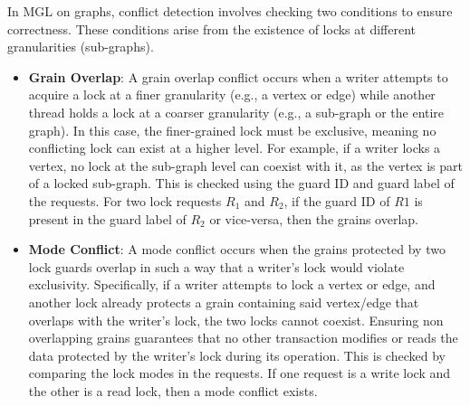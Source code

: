 In MGL on graphs, conflict detection involves checking two conditions to ensure correctness. These conditions arise from the existence of locks at different granularities (sub-graphs).
\begin{itemize}
	\item \textbf{Grain Overlap}: A grain overlap conflict occurs when a writer attempts to acquire a lock at a finer granularity (e.g., a vertex or edge) while another thread holds a lock at a coarser granularity (e.g., a sub-graph or the entire graph). In this case, the finer-grained lock must be exclusive, meaning no conflicting lock can exist at a higher level. For example, if a writer locks a vertex, no lock at the sub-graph level can coexist with it, as the vertex is part of a locked sub-graph. This is checked using the guard ID and guard label of the requests. For two lock requests $R_1$ and $R_2$, if the guard ID of $R1$ is present in the guard label of $R_2$ or vice-versa, then the grains overlap.
	
	\item \textbf{Mode Conflict}: A mode conflict occurs when the grains protected by two lock guards overlap in such a way that a writer’s lock would violate exclusivity. Specifically, if a writer attempts to lock a vertex or edge, and another lock already protects a grain containing said vertex/edge that overlaps with the writer’s lock, the two locks cannot coexist. Ensuring non overlapping grains guarantees that no other transaction modifies or reads the data protected by the writer’s lock during its operation. This is checked by comparing the lock modes in the requests. If one request is a write lock and the other is a read lock, then a mode conflict exists.
\end{itemize}




